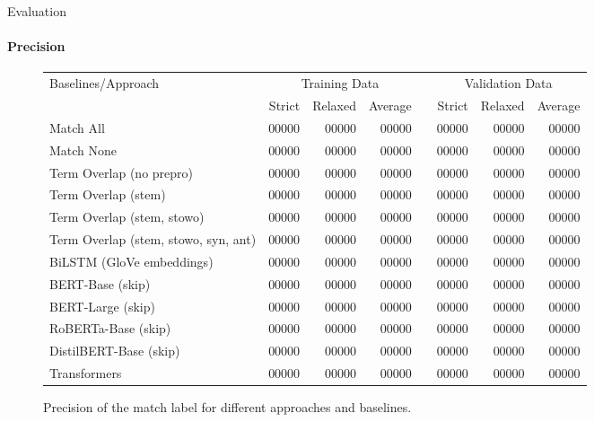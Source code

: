 \documentclass[english,handout]{mlutalk}
\begin{document}
\begin{frame}{Evaluation}
  \framesubtitle{Precision}
  \begin{figure}
    \centering
    \caption{Precision of the match label for different approaches and baselines.}
    \tiny
    \begin{tabular}{lrrrlrrr}
      \toprule
      Baselines/Approach & \multicolumn{3}{c}{Training Data} & & \multicolumn{3}{c}{Validation Data}\\ \cline{2-4} \cline{6-8}
        & Strict & Relaxed & Average & & Strict & Relaxed & Average\\
      \midrule
      Match All                           & 00000 & 00000 & 00000 & & 00000 & 00000 & 00000\\
      Match None                          & 00000 & 00000 & 00000 & & 00000 & 00000 & 00000\\
      Term Overlap (no prepro)            & 00000 & 00000 & 00000 & & 00000 & 00000 & 00000\\
      Term Overlap (stem)                 & 00000 & 00000 & 00000 & & 00000 & 00000 & 00000\\
      Term Overlap (stem, stowo)          & 00000 & 00000 & 00000 & & 00000 & 00000 & 00000\\
      Term Overlap (stem, stowo, syn, ant)& 00000 & 00000 & 00000 & & 00000 & 00000 & 00000\\
      \midrule
      BiLSTM (GloVe embeddings)           & 00000 & 00000 & 00000 & & 00000 & 00000 & 00000\\
      BERT-Base (skip)                    & 00000 & 00000 & 00000 & & 00000 & 00000 & 00000\\
      BERT-Large (skip)                   & 00000 & 00000 & 00000 & & 00000 & 00000 & 00000\\
      RoBERTa-Base (skip)                 & 00000 & 00000 & 00000 & & 00000 & 00000 & 00000\\
      DistilBERT-Base (skip)              & 00000 & 00000 & 00000 & & 00000 & 00000 & 00000\\
      Transformers                        & 00000 & 00000 & 00000 & & 00000 & 00000 & 00000\\
      \bottomrule
    \end{tabular}
  \end{figure}
\end{frame}
\end{document}
